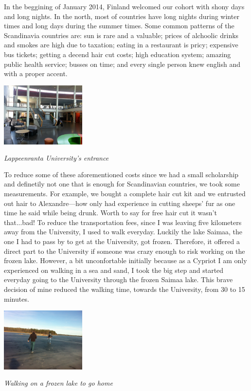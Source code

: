 \documentclass[10pt,a4paper]{article} %
\begin{document}
\begin{multicols}{3}
   
In the beggining of January 2014, Finland welcomed our cohort with shony days 
and long nights. 
In the north, most of countries have long nights during winter times and long 
days during the summer times. 
Some common patterns of the Scandinavia countries are: sun is rare and a valuable; 
prices of alchoolic drinks and smokes are high due to taxation; eating in a 
restaurant is pricy; expensive bus tickets; getting a decend hair cut costs; 
high education system; amazing public health service; busses on time; 
and every single person knew english and with a proper accent.
     

\begin{center}
	\includegraphics[width=0.32\textwidth]{media/entrance_university.jpg}
	\par\textit{Lappeenranta University's entrance}
\end{center}


To reduce some of these aforementioned costs since we had a small scholarship and 
definetily not one that is enough for Scandinavian countries, we took some 
measurements. 
For example, we bought a complete hair cut kit and we entrusted out hair to 
Alexandre---how only had experience in cutting sheeps' fur as one time he said 
while being drunk.  
Worth to say for free hair cut it wasn't that...bad! 
To reduce the transportation fees, since I was leaving five kilometers away from 
the University, I used to walk everyday. 
Luckily the lake Saimaa, the one I had to pass by to get at the University, got 
frozen. 
Therefore, it offered a direct part to the University if someone was crazy enough 
to risk working on the frozen lake. 
However, a bit unconfortable initially because as a Cypriot I am only experienced 
on walking in a sea and sand, I took the big step and started everyday 
going to the University through the frozen Saimaa lake.
This brave decision of mine reduced the walking time, towards the University, from 
30 to 15 minutes.


\begin{center}
	\includegraphics[width=0.32\textwidth]{media/walking_on_ice.jpg}
	\par\textit{Walking on a frozen lake to go home}
\end{center}



\end{multicols}
\end{document}
